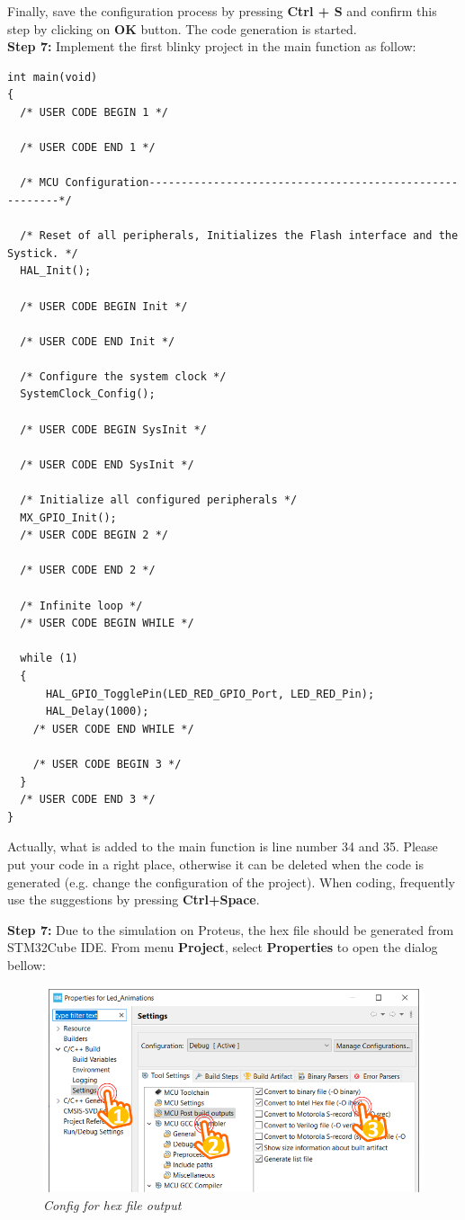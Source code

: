 Finally, save the configuration process by pressing \textbf{Ctrl + S} and confirm this step by clicking on \textbf{OK} button. The code generation is started.\\

\textbf{Step 7: } Implement the first blinky project in the main function as follow:
\begin{lstlisting}[caption=First blinky LED project]
int main(void)
{
  /* USER CODE BEGIN 1 */

  /* USER CODE END 1 */

  /* MCU Configuration--------------------------------------------------------*/

  /* Reset of all peripherals, Initializes the Flash interface and the Systick. */
  HAL_Init();

  /* USER CODE BEGIN Init */

  /* USER CODE END Init */

  /* Configure the system clock */
  SystemClock_Config();

  /* USER CODE BEGIN SysInit */

  /* USER CODE END SysInit */

  /* Initialize all configured peripherals */
  MX_GPIO_Init();
  /* USER CODE BEGIN 2 */

  /* USER CODE END 2 */

  /* Infinite loop */
  /* USER CODE BEGIN WHILE */
 
  while (1)
  {
	  HAL_GPIO_TogglePin(LED_RED_GPIO_Port, LED_RED_Pin);
	  HAL_Delay(1000);
    /* USER CODE END WHILE */

    /* USER CODE BEGIN 3 */
  }
  /* USER CODE END 3 */
}
\end{lstlisting}

Actually, what is added to the main function is line number 34 and 35. Please put your code in a right place, otherwise it can be deleted when the code is generated (e.g. change the configuration of the project). When coding, frequently use the suggestions by pressing \textbf{Ctrl+Space}.

\textbf{Step 7: } Due to the simulation on Proteus, the hex file should be generated from STM32Cube IDE. From menu \textbf{Project}, select \textbf{Properties} to open the dialog bellow:

\begin{figure}[!htp]
    \centering
    \includegraphics[width=5in]{source/picture/bai_1/stm_07.PNG}
    \caption{\textit{Config for hex file output}}
    \label{bai1_pic5}
\end{figure}

